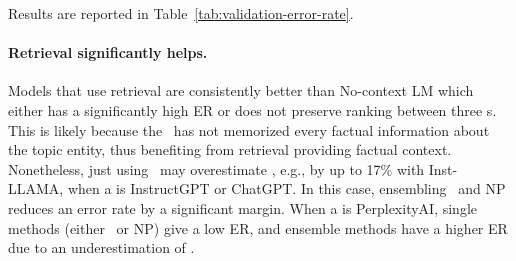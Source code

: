\vspace{.3em}
\noindent
Results are reported in Table~\ref{tab:validation-error-rate}.

\vspace{-.3em}
\paragraph{Retrieval significantly helps.}
Models that use retrieval are consistently better than No-context LM which either has a significantly high ER or does not preserve ranking between three \subjectLM{}s.
This is likely because the \evalLM\ has not memorized every factual information about the topic entity, thus benefiting from retrieval providing factual context.
%
Nonetheless, just using \rtg\ may overestimate \ours, e.g., by up to 17\% with Inst-LLAMA, when a \subjectLM{} is InstructGPT or ChatGPT.
In this case, ensembling \rtg\ and NP reduces an error rate by a significant margin. %
When a \subjectLM{} is PerplexityAI, single methods (either \rtg\ or NP) give a low ER, and ensemble methods have a higher ER due to an underestimation of \ours.

\vspace{-.3em}
